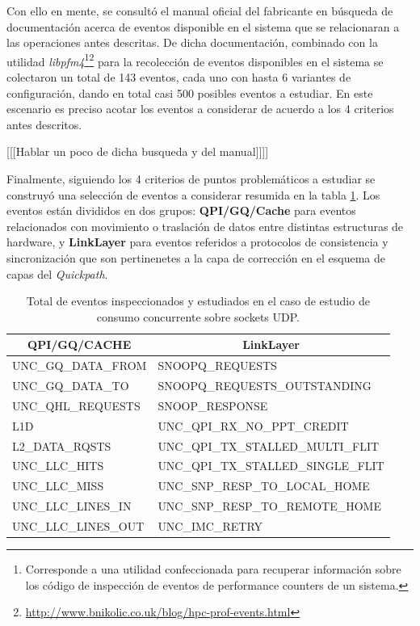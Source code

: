 Con ello en mente, se consultó el manual oficial del fabricante \cite{manual:bigbigevents} en búsqueda de documentación acerca de eventos disponible en el sistema que se relacionaran a las operaciones antes descritas. De dicha documentación, combinado con la utilidad \emph{libpfm4}\footnote{Corresponde a una utilidad confeccionada para recuperar información sobre los código de inspección de eventos de performance counters de un sistema.}\footnote{\url{http://www.bnikolic.co.uk/blog/hpc-prof-events.html}} para la recolección de eventos disponibles en el sistema se colectaron un total de 143 eventos, cada uno con hasta 6 variantes de configuración, dando en total casi 500 posibles eventos a estudiar. En este escenario es preciso acotar los eventos a considerar de acuerdo a los 4 criterios antes descritos.


[[[Hablar un poco de dicha busqueda y del manual]]]]

Finalmente, siguiendo los 4 criterios de puntos problemáticos a estudiar se construyó una selección de eventos a considerar resumida en la tabla \ref{table:eventos}. Los eventos están divididos en dos grupos: \textbf{QPI/GQ/Cache} para eventos relacionados con movimiento o traslación de datos entre distintas estructuras de hardware, y \textbf{LinkLayer} para eventos referidos a protocolos de consistencia y sincronización que son pertinenetes a la capa de corrección en el esquema de capas del \emph{Quickpath}.

\begin{table}[h!]
\centering
\begin{tabular}{l|l}
\multicolumn{1}{c|}{{\bf QPI/GQ/CACHE}} & \multicolumn{1}{c}{{\bf LinkLayer}} \\ \hline
{ UNC\_GQ\_DATA\_FROM} & SNOOPQ\_REQUESTS \\
{ UNC\_GQ\_DATA\_TO} & SNOOPQ\_REQUESTS\_OUTSTANDING \\
{ UNC\_QHL\_REQUESTS} & SNOOP\_RESPONSE \\
{ L1D} & UNC\_QPI\_RX\_NO\_PPT\_CREDIT \\
{ L2\_DATA\_RQSTS} & UNC\_QPI\_TX\_STALLED\_MULTI\_FLIT \\
{ UNC\_LLC\_HITS} & UNC\_QPI\_TX\_STALLED\_SINGLE\_FLIT \\
{ UNC\_LLC\_MISS} & UNC\_SNP\_RESP\_TO\_LOCAL\_HOME \\
{ UNC\_LLC\_LINES\_IN} & UNC\_SNP\_RESP\_TO\_REMOTE\_HOME \\
{ UNC\_LLC\_LINES\_OUT} & UNC\_IMC\_RETRY
\end{tabular}
\caption{Total de eventos inspeccionados y estudiados en el caso de estudio de consumo concurrente sobre sockets UDP.}
\label{table:eventos}
\end{table}

